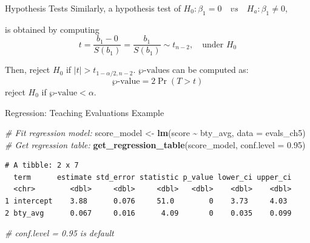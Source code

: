 \documentclass[
  ignorenonframetext,
]{beamer}
\newenvironment{Shaded}{\begin{snugshade}}{\end{snugshade}}
\newcommand{\AttributeTok}[1]{\textcolor[rgb]{0.13,0.29,0.53}{#1}}
\newcommand{\CommentTok}[1]{\textcolor[rgb]{0.56,0.35,0.01}{\textit{#1}}}
\newcommand{\FloatTok}[1]{\textcolor[rgb]{0.00,0.00,0.81}{#1}}
\newcommand{\FunctionTok}[1]{\textcolor[rgb]{0.13,0.29,0.53}{\textbf{#1}}}
\newcommand{\NormalTok}[1]{#1}
\newcommand{\OtherTok}[1]{\textcolor[rgb]{0.56,0.35,0.01}{#1}}
\newcommand{\SpecialCharTok}[1]{\textcolor[rgb]{0.81,0.36,0.00}{\textbf{#1}}}
\begin{document}
\begin{frame}{Hypothesis Tests}
\label{hypothesis-tests-1}
Similarly, a hypothesis test of
\(H_0: \beta_1=0\quad vs \quad H_a: \beta_1\neq0\),

is obtained by computing
\[ t=\frac{b_1-0}{S(b_1)}=\frac{b_1}{S(b_1)}\sim t_{n-2}, \quad \text{under } H_0\]

Then, reject \(H_0\) if \(|t|>t_{1-\alpha/2, n-2}\).
\(\wp\text{-value}\)s can be computed as: \[\wp\text{-value}=2\Pr(T>t)\]
reject \(H_0\) if \(\wp\text{-value}<\alpha\).
\end{frame}

\begin{frame}[fragile]{Regression: Teaching Evaluations Example}
\label{regression-teaching-evaluations-example-7}
\small

\begin{Shaded}
\begin{Highlighting}[]
\CommentTok{\# Fit regression model:}
\NormalTok{score\_model }\OtherTok{\textless{}{-}} \FunctionTok{lm}\NormalTok{(score }\SpecialCharTok{\textasciitilde{}}\NormalTok{ bty\_avg, }\AttributeTok{data =}\NormalTok{ evals\_ch5)}
\CommentTok{\# Get regression table:}
\FunctionTok{get\_regression\_table}\NormalTok{(score\_model, }\AttributeTok{conf.level =} \FloatTok{0.95}\NormalTok{) }
\end{Highlighting}
\end{Shaded}

\begin{verbatim}
# A tibble: 2 x 7
  term      estimate std_error statistic p_value lower_ci upper_ci
  <chr>        <dbl>     <dbl>     <dbl>   <dbl>    <dbl>    <dbl>
1 intercept    3.88      0.076     51.0        0    3.73     4.03 
2 bty_avg      0.067     0.016      4.09       0    0.035    0.099
\end{verbatim}

\begin{Shaded}
\begin{Highlighting}[]
\CommentTok{\# conf.level = 0.95 is default}
\end{Highlighting}
\end{Shaded}

\normalsize
\end{frame}
\end{document}
